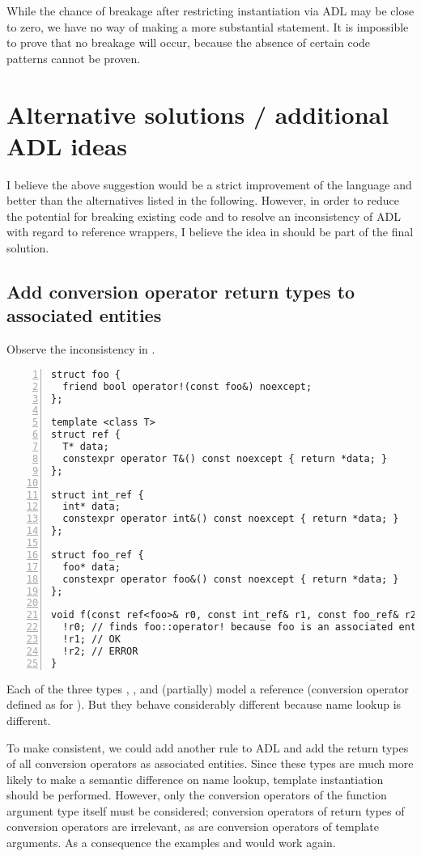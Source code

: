 While the chance of breakage after restricting instantiation via ADL may be close to zero, 
we have no way of making a more substantial statement. It is impossible to prove that no 
breakage will occur, because the absence of certain code patterns cannot be proven.

\section{Alternative solutions / additional ADL ideas}

I believe the above suggestion would be a strict improvement of the \CC{} language and 
better than the alternatives listed in the following. However, in order to reduce the 
potential for breaking existing code and to resolve an inconsistency of ADL with regard to 
reference wrappers, I believe the idea in  should be part of the final 
solution.

\subsection{Add conversion operator return types to associated entities}
\label{sec:convopadl}
Observe the inconsistency in .
\begin{lstlisting}[style=Vc,numbers=left,float,label=lst:motivateADLconvop,caption={
Different name lookup for three reference types that should be equivalent 
(\url{https://godbolt.org/z/83fqT76vn})
}]
struct foo {
  friend bool operator!(const foo&) noexcept;
};

template <class T>
struct ref {
  T* data;
  constexpr operator T&() const noexcept { return *data; }
};

struct int_ref {
  int* data;
  constexpr operator int&() const noexcept { return *data; }
};

struct foo_ref {
  foo* data;
  constexpr operator foo&() const noexcept { return *data; }
};

void f(const ref<foo>& r0, const int_ref& r1, const foo_ref& r2) {
  !r0; // finds foo::operator! because foo is an associated entity
  !r1; // OK
  !r2; // ERROR
}
\end{lstlisting}
Each of the three types , , and  (partially) 
model a reference (conversion operator defined as for ). 
But they behave considerably different because name lookup is different.

To make  consistent, we could add another rule to ADL and add the 
return types of all conversion operators as associated entities. Since these types are 
much more likely to make a semantic difference on name lookup, template instantiation 
should be performed. However, only the conversion operators of the function argument type 
itself must be considered; conversion operators of return types of conversion operators 
are irrelevant, as are conversion operators of template arguments. As a consequence the 
examples  and  would work again.


